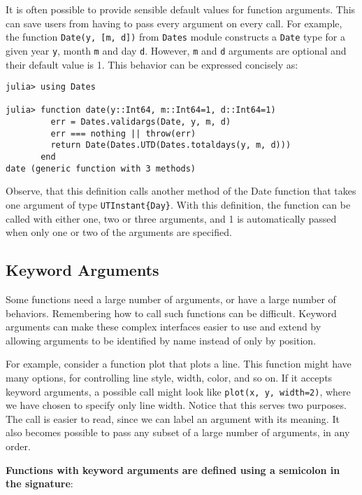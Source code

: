 \documentclass[
]{article}
\begin{document}
It is often possible to provide sensible default values for function
arguments. This can save users from having to pass every argument on
every call. For example, the function \texttt{Date(y,\ {[}m,\ d{]})}
from \texttt{Dates} module constructs a \texttt{Date} type for a given
year \texttt{y}, month \texttt{m} and day \texttt{d}. However,
\texttt{m} and \texttt{d} arguments are optional and their default value
is 1. This behavior can be expressed concisely as:

\begin{verbatim}
julia> using Dates

julia> function date(y::Int64, m::Int64=1, d::Int64=1)
         err = Dates.validargs(Date, y, m, d)
         err === nothing || throw(err)
         return Date(Dates.UTD(Dates.totaldays(y, m, d)))
       end
date (generic function with 3 methods)
\end{verbatim}

Observe, that this definition calls another method of the Date function
that takes one argument of type \texttt{UTInstant\{Day\}}. With this
definition, the function can be called with either one, two or three
arguments, and 1 is automatically passed when only one or two of the
arguments are specified.

\hypertarget{keyword-arguments}{%
\subsection{Keyword Arguments}\label{keyword-arguments}}

Some functions need a large number of arguments, or have a large number
of behaviors. Remembering how to call such functions can be difficult.
Keyword arguments can make these complex interfaces easier to use and
extend by allowing arguments to be identified by name instead of only by
position.

For example, consider a function plot that plots a line. This function
might have many options, for controlling line style, width, color, and
so on. If it accepts keyword arguments, a possible call might look like
\texttt{plot(x,\ y,\ width=2)}, where we have chosen to specify only
line width. Notice that this serves two purposes. The call is easier to
read, since we can label an argument with its meaning. It also becomes
possible to pass any subset of a large number of arguments, in any
order.

\textbf{Functions with keyword arguments are defined using a semicolon
in the signature}:
\end{document}
